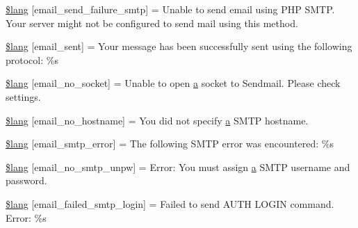 \begin{DoxyCompactItemize}
\item 
\hyperlink{system_2language_2english_2email__lang_8php_a37e19fc7057ba5d5300dd3e83cefc5a2}{\$lang} \mbox{[}\textquotesingle{}email\+\_\+send\+\_\+failure\+\_\+smtp\textquotesingle{}\mbox{]} = \textquotesingle{}Unable to send email using P\+H\+P S\+M\+T\+P. Your server might not be configured to send mail using this method.\textquotesingle{}
\item 
\hyperlink{system_2language_2english_2email__lang_8php_a7e5c67019fdffb596af1af5a94247ba9}{\$lang} \mbox{[}\textquotesingle{}email\+\_\+sent\textquotesingle{}\mbox{]} = \textquotesingle{}Your message has been successfully sent using the following protocol\+: \%s\textquotesingle{}
\item 
\hyperlink{system_2language_2english_2email__lang_8php_a78f8be783ca93e91af775994ddc87cb7}{\$lang} \mbox{[}\textquotesingle{}email\+\_\+no\+\_\+socket\textquotesingle{}\mbox{]} = \textquotesingle{}Unable to open \hyperlink{_admin_2assets_2js_2bootstrap_8min_8js_a1f5870dcf487187f13d5fd328ed9e6e7}{a} socket to Sendmail. Please check settings.\textquotesingle{}
\item 
\hyperlink{system_2language_2english_2email__lang_8php_a03905b414e05a5d3cfd0fe88868615f5}{\$lang} \mbox{[}\textquotesingle{}email\+\_\+no\+\_\+hostname\textquotesingle{}\mbox{]} = \textquotesingle{}You did not specify \hyperlink{_admin_2assets_2js_2bootstrap_8min_8js_a1f5870dcf487187f13d5fd328ed9e6e7}{a} S\+M\+T\+P hostname.\textquotesingle{}
\item 
\hyperlink{system_2language_2english_2email__lang_8php_a3d70a704117491053ad9c0b4065ecd3f}{\$lang} \mbox{[}\textquotesingle{}email\+\_\+smtp\+\_\+error\textquotesingle{}\mbox{]} = \textquotesingle{}The following S\+M\+T\+P error was encountered\+: \%s\textquotesingle{}
\item 
\hyperlink{system_2language_2english_2email__lang_8php_a268c3e96fea16a903e7488f03960e89a}{\$lang} \mbox{[}\textquotesingle{}email\+\_\+no\+\_\+smtp\+\_\+unpw\textquotesingle{}\mbox{]} = \textquotesingle{}Error\+: You must assign \hyperlink{_admin_2assets_2js_2bootstrap_8min_8js_a1f5870dcf487187f13d5fd328ed9e6e7}{a} S\+M\+T\+P username and password.\textquotesingle{}
\item 
\hyperlink{system_2language_2english_2email__lang_8php_a791781c2fd1bd8ec87158be649519621}{\$lang} \mbox{[}\textquotesingle{}email\+\_\+failed\+\_\+smtp\+\_\+login\textquotesingle{}\mbox{]} = \textquotesingle{}Failed to send A\+U\+T\+H L\+O\+G\+I\+N command. Error\+: \%s\textquotesingle{}
\item 

\end{DoxyCompactItemize}
